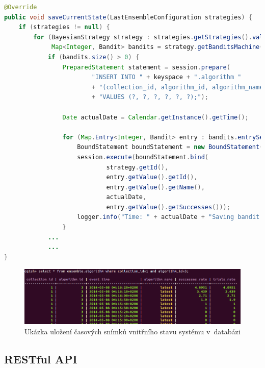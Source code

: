 \documentclass[thesis=M,czech]{FITthesis}[2014/05/07]
\begin{document}
\begin{lstlisting}[language=java]
@Override
public void saveCurrentState(LastEnsembleConfiguration strategies) {
    if (strategies != null) {
        for (BayesianStrategy strategy : strategies.getStrategies().values()) {
             Map<Integer, Bandit> bandits = strategy.getBanditsMachine().getBanditList();
            if (bandits.size() > 0) {
                PreparedStatement statement = session.prepare(
                        "INSERT INTO " + keyspace + ".algorithm "
                        + "(collection_id, algorithm_id, algorithm_name, event_time, trials_rate, successes_rate) "
                        + "VALUES (?, ?, ?, ?, ?, ?);");

                Date actualDate = Calendar.getInstance().getTime();

                for (Map.Entry<Integer, Bandit> entry : bandits.entrySet()) {
                    BoundStatement boundStatement = new BoundStatement(statement);
                    session.execute(boundStatement.bind(
                            strategy.getId(),
                            entry.getValue().getId(),
                            entry.getValue().getName(),
                            actualDate,
                            entry.getValue().getSuccesses()));
                    logger.info("Time: " + actualDate + "Saving bandit with ID " + entry.getValue().getName() + " into collection : " + strategy.getCollectionId());
                }
			...
			...			
}
\end{lstlisting}

\begin{figure}\centering
	\includegraphics[width=1.0\textwidth]{obr/cassandra.png}
 	\caption[Ukázka uložení časových snímků vnitřního stavu systému v~databázi]{Ukázka uložení časových snímků vnitřního stavu systému v~databázi}\label{fig:plista}
\end{figure}	

\subsection{RESTful API}
\label{sub:restapi}
\end{document}
